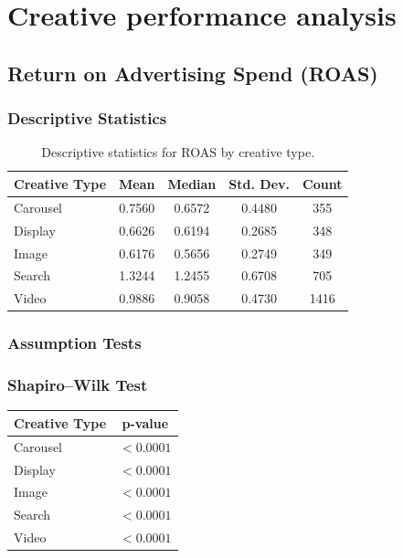 
\section{Creative performance analysis}
\label{appendix:creative_performance_analysis}

\subsection{Return on Advertising Spend (ROAS)}
\label{appendix:creative_performance_analysis_ROAS}

\subsubsection{Descriptive Statistics}

\begin{table}[H]
	\centering
	\caption{Descriptive statistics for ROAS by creative type.}
	\begin{tabular}{lcccc}
		\toprule
		Creative Type & Mean & Median & Std. Dev. & Count \\
		\midrule
		Carousel & 0.7560 & 0.6572 & 0.4480 & 355 \\
		Display & 0.6626 & 0.6194 & 0.2685 & 348 \\
		Image & 0.6176 & 0.5656 & 0.2749 & 349 \\
		Search & 1.3244 & 1.2455 & 0.6708 & 705 \\
		Video & 0.9886 & 0.9058 & 0.4730 & 1416 \\
		\bottomrule
	\end{tabular}
\end{table}

\subsubsection{Assumption Tests}

\subsubsection{Shapiro--Wilk Test}

\begin{table}[H]
	\centering
	\begin{tabular}{lc}
		\toprule
		Creative Type & p-value \\
		\midrule
		Carousel & $<0.0001$ \\
		Display & $<0.0001$ \\
		Image & $<0.0001$ \\
		Search & $<0.0001$ \\
		Video & $<0.0001$ \\
		\bottomrule
	\end{tabular}
\end{table}

